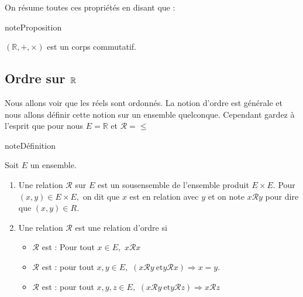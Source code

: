 \documentclass[letterpaper,10pt,french]{jupyterBook}
\begin{document}
\sphinxAtStartPar
On résume toutes ces propriétés en disant que :

\begin{sphinxadmonition}{note}{Proposition}

\sphinxAtStartPar
\((\mathbb{R},+,\times)\) est un corps commutatif.
\end{sphinxadmonition}


\subsection{Ordre sur \protect\(\mathbb{R}\protect\)}
\label{\detokenize{proprties:ordre-sur-mathbb-r}}
\sphinxAtStartPar
Nous allons voir que les réels sont ordonnés. La notion d’ordre est générale et nous allons définir cette notion sur un
ensemble quelconque. Cependant gardez à l’esprit que pour nous \(E=\mathbb{R}\) et \(\mathcal{R}=\leq\)

\begin{sphinxadmonition}{note}{Définition}

\sphinxAtStartPar
Soit \(E\) un ensemble.
\begin{enumerate}
%
\item {} 
\sphinxAtStartPar
Une relation \(\mathcal{R}\) sur \(E\) est un sous\sphinxhyphen{}ensemble de l’ensemble produit \(E\times E.\) Pour \((x,y)\in E\times E,\) on dit que \(x\) est en relation avec \(y\) et on note \(x\mathcal{R}y\) pour dire que \((x,y)\in R.\)

\item {} 
\sphinxAtStartPar
Une relation \(\mathcal{R}\) est une relation d’ordre si
\begin{itemize}
\item {} 
\sphinxAtStartPar
\(\mathcal{R}\) est : Pour tout \(x\in E,\) \(x\mathcal{R}x\)

\item {} 
\sphinxAtStartPar
\(\mathcal{R}\) est : pour tout \(x,y\in E,\) \((x\mathcal{R}y\:\mbox{et} y\mathcal{R}x) \Rightarrow x=y.\)

\item {} 
\sphinxAtStartPar
\(\mathcal{R}\) est : pour tout \(x,y,z\in E,\) \((x\mathcal{R}y\:\mbox{et} y\mathcal{R}z)\Rightarrow x\mathcal{R}z\)

\end{itemize}

\end{enumerate}
\end{sphinxadmonition}
\end{document}
